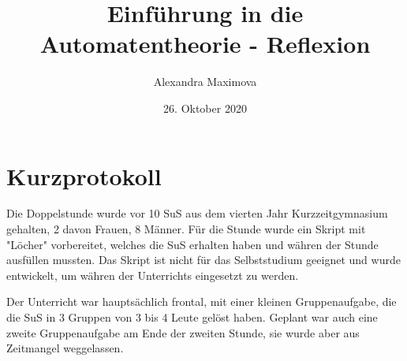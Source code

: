 \documentclass{article}
\title{Einführung in die Automatentheorie - Reflexion}
\author{Alexandra Maximova}
\date{26. Oktober 2020}
\begin{document}
\maketitle
\section*{Kurzprotokoll}
Die Doppelstunde wurde vor 10 SuS aus dem vierten Jahr Kurzzeitgymnasium gehalten, 2 davon Frauen, 8 Männer. Für die Stunde wurde ein Skript mit "Löcher" vorbereitet, welches die SuS erhalten haben und währen der Stunde ausfüllen mussten. Das Skript ist nicht für das Selbststudium geeignet und wurde entwickelt, um währen der Unterrichts eingesetzt zu werden.

Der Unterricht war hauptsächlich frontal, mit einer kleinen Gruppenaufgabe, die die SuS in 3 Gruppen von 3 bis 4 Leute gelöst haben. Geplant war auch eine zweite Gruppenaufgabe am Ende der zweiten Stunde, sie wurde aber aus Zeitmangel weggelassen.
\end{document}
